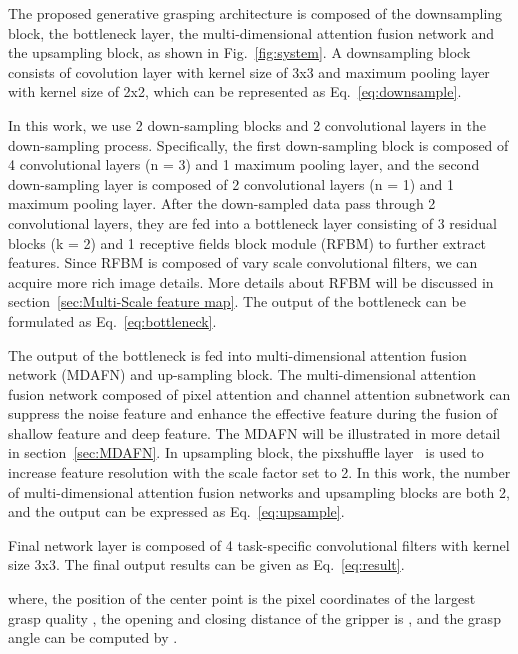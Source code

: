 \documentclass[journal]{IEEEtran}
\begin{document}
The proposed generative grasping architecture is composed of the downsampling block, the bottleneck layer, the multi-dimensional attention fusion network and the upsampling block, as shown in Fig.~\ref{fig:system}. 
A downsampling block consists of covolution layer with kernel size of 3x3 and maximum pooling layer with kernel size of 2x2, which can be represented as Eq.~\ref{eq:downsample}. 



In this work, we use 2 down-sampling blocks and 2 convolutional layers in the down-sampling process. Specifically, the first down-sampling block is composed of 4 convolutional layers (n = 3) and 1 maximum pooling layer, and the second down-sampling layer is composed of 2 convolutional layers (n = 1) and 1 maximum pooling layer. After the down-sampled data pass through 2 convolutional layers,  they are fed into a bottleneck layer consisting of 3 residual blocks (k = 2) and 1 receptive fields block module (RFBM) to further extract features. Since RFBM is composed of vary scale convolutional filters, we can acquire more rich image details. More details about RFBM will be discussed in section~\ref{sec:Multi-Scale feature map}. The output of the bottleneck can be formulated as Eq.~\ref{eq:bottleneck}.



The output  of the bottleneck is fed into multi-dimensional attention fusion network (MDAFN) and up-sampling block. The multi-dimensional attention fusion network composed of pixel attention and channel attention subnetwork can suppress the noise feature and enhance the effective feature during the fusion of shallow feature and deep feature. The MDAFN will be illustrated in more detail in section~\ref{sec:MDAFN}. In upsampling block, the pixshuffle layer~\cite{pixshuffle} is used to increase feature resolution with the scale factor set to 2. In this work, the number of multi-dimensional attention fusion networks and upsampling blocks are both 2, and the output can be expressed as Eq.~\ref{eq:upsample}.



Final network layer is composed of 4 task-specific convolutional filters with kernel size 3x3. The final output results can be given as Eq.~\ref{eq:result}.




where, the position of the center point is the pixel coordinates of the largest grasp quality , the opening and closing distance of the gripper is , and the grasp angle can be computed by .
\end{document}
